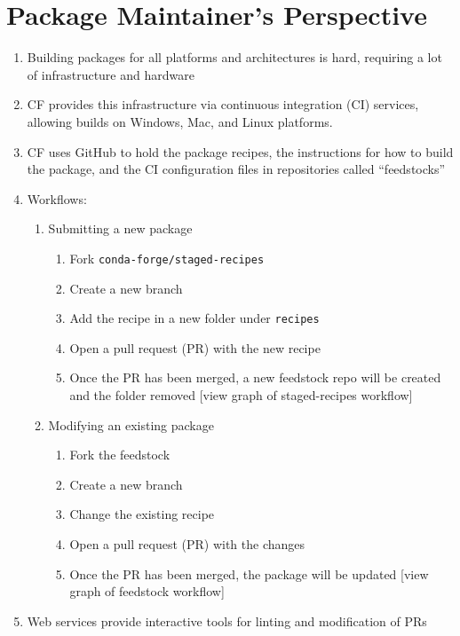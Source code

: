 \documentclass[fleqn,10pt,lineno]{wlpeerj} %
\newcommand{\sjb}[1]{\textcolor{blue}{[sjb:#1]}}
\newcounter{saveenumi}
\newcommand{\seti}{\setcounter{saveenumi}{\value{enumi}}}
\newcommand{\conti}{\setcounter{enumi}{\value{saveenumi}}}
\begin{document}
\section*{Package Maintainer's Perspective}
\begin{enumerate}\conti
\item Building packages for all platforms and architectures is hard, requiring
a lot of infrastructure and hardware
\item CF provides this infrastructure via continuous integration (CI) services,
allowing builds on Windows, Mac, and Linux platforms.
\item CF uses GitHub to hold the package recipes, the instructions for how to 
build the package, and the CI configuration files in repositories called ``feedstocks''
\item Workflows:
\begin{enumerate}
    \item Submitting a new package
        \begin{enumerate}
            \item Fork \texttt{conda-forge/staged-recipes}
            \item Create a new branch
            \item Add the recipe in a new folder under \texttt{recipes}
            \item Open a pull request (PR) with the new recipe
            \item Once the PR has been merged, a new feedstock repo
                will be created and the folder removed
[view graph of staged-recipes workflow]
        \end{enumerate}
    \item Modifying an existing package
        \begin{enumerate}
            \item Fork the feedstock
            \item Create a new branch
            \item Change the existing recipe
            \item Open a pull request (PR) with the changes
            \item Once the PR has been merged, the package will be updated
[view graph of feedstock workflow]
        \end{enumerate}
\end{enumerate}
\item Web services provide interactive tools for linting and modification of PRs
\end{enumerate}\seti
\end{document}
